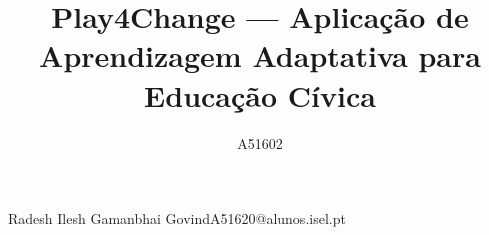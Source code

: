 \def\thetitle{%
 Play4Change --- Aplicação de Aprendizagem Adaptativa para Educação Cívica
}
\def\titlemain{Play4Change}
\def\titlesub{Aplicação de Aprendizagem Adaptativa para Educação Cívica}
\def\theauthor{%
 A51602
}

\title{ \thetitle }

\author{A51602}{Radesh Ilesh Gamanbhai Govind}{A51620@alunos.isel.pt}


